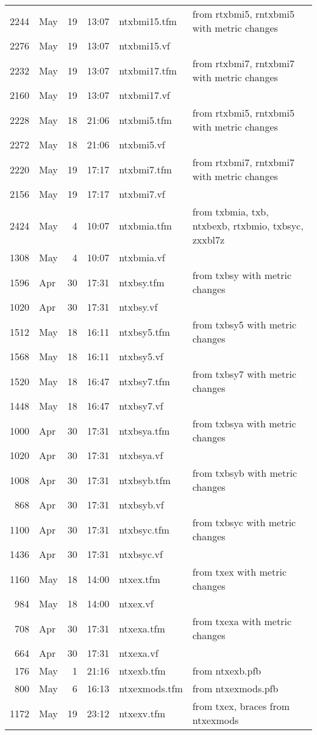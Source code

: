 \documentclass[10pt]{amsart}
\begin{document}
\begin{center}
\begin{longtable}{@{} rlrrll @{}}
2244&May&19&13:07&ntxbmi15.tfm& from rtxbmi5, rntxbmi5 with metric changes \\
2276&May&19&13:07&ntxbmi15.vf\\
2232&May&19&13:07&ntxbmi17.tfm& from rtxbmi7, rntxbmi7 with metric changes\\
2160&May&19&13:07&ntxbmi17.vf\\
2228&May&18&21:06&ntxbmi5.tfm& from rtxbmi5, rntxbmi5 with metric changes\\
2272&May&18&21:06&ntxbmi5.vf\\
2220&May&19&17:17&ntxbmi7.tfm& from rtxbmi7, rntxbmi7 with metric changes\\
2156&May&19&17:17&ntxbmi7.vf\\
2424&May&4&10:07&ntxbmia.tfm& from txbmia, txb, ntxbexb, rtxbmio, txbsyc, zxxbl7z\\
1308&May&4&10:07&ntxbmia.vf\\
1596&Apr&30&17:31&ntxbsy.tfm& from txbsy with metric changes\\
1020&Apr&30&17:31&ntxbsy.vf\\
1512&May&18&16:11&ntxbsy5.tfm& from txbsy5 with metric changes\\
1568&May&18&16:11&ntxbsy5.vf\\
1520&May&18&16:47&ntxbsy7.tfm& from txbsy7 with metric changes\\
1448&May&18&16:47&ntxbsy7.vf\\
1000&Apr&30&17:31&ntxbsya.tfm& from txbsya with metric changes\\
1020&Apr&30&17:31&ntxbsya.vf\\
1008&Apr&30&17:31&ntxbsyb.tfm& from txbsyb with metric changes\\
868&Apr&30&17:31&ntxbsyb.vf\\
1100&Apr&30&17:31&ntxbsyc.tfm& from txbsyc with metric changes\\
1436&Apr&30&17:31&ntxbsyc.vf\\
1160&May&18&14:00&ntxex.tfm& from txex with metric changes\\
984&May&18&14:00&ntxex.vf\\
708&Apr&30&17:31&ntxexa.tfm& from txexa with metric changes\\
664&Apr&30&17:31&ntxexa.vf\\
176&May&1&21:16&ntxexb.tfm& from ntxexb.pfb\\
800&May&6&16:13&ntxexmods.tfm& from ntxexmods.pfb\\
1172&May&19&23:12&ntxexv.tfm& from txex, braces from ntxexmods\\

\end{longtable}
\end{center}
\end{document}
